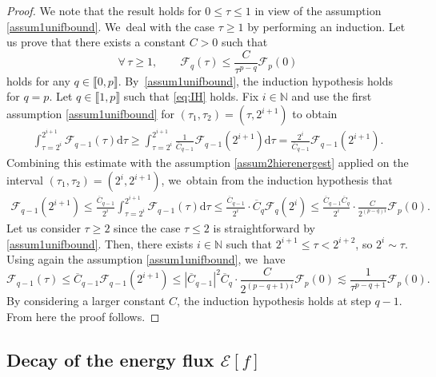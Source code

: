 \documentclass[JEP,XML,SOM,Unicode,published]{cedram}
\theoremstyle{plain}
\theoremstyle{definition}
\newcommand\dr{{\mathrm{d}}}
\begin{document}
\begin{proof}
We note that the result holds for $0 \leq \tau \leq 1$ in view of the assumption \ref{assum1unifbound}. We~deal with the case $\tau \geq 1$ by performing an induction. Let us prove that there exists a constant $C>0$ such that
\begin{equation}\label{eq:IH}
\forall \, \tau \geq 1, \qquad \mathcal{F}_q(\tau) \leq \frac{C}{\tau^{p-q}} \mathcal{F}_p(0) \tag{IH-q}
\end{equation}
holds for any $q \in \llbracket 0,p \rrbracket$. By~\ref{assum1unifbound}, the induction hypothesis holds for $q=p$. Let $q \in \llbracket 1,p \rrbracket$ such that \eqref{eq:IH} holds. Fix $i \in \mathbb{N}$ and use the first assumption \ref{assum1unifbound} for $(\tau_1,\tau_2)=(\tau,2^{i+1})$ to obtain
\begin{align*}
\int_{ \tau= 2^i}^{2^{i+1}} \mathcal{F}_{q-1}(\tau) \dr \tau \geq \int_{\tau = 2^i}^{2^{i+1}} \frac{1}{\overline{C}_{q-1}} \mathcal{F}_{q-1} (2^{i+1})\dr \tau =\frac{2^i}{\overline{C}_{q-1}} \mathcal{F}_{q-1} (2^{i+1}).
\end{align*}
Combining this estimate with the assumption \ref{assum2hierenergest} applied on the interval $(\tau_1,\tau_2)=(2^i,2^{i+1})$, we~obtain from the induction hypothesis that
\begin{align*}
\mathcal{F}_{q-1} (2^{i+1}) \leq \frac{\overline{C}_{q-1}}{2^i} \int_{ \tau=2^i}^{2^{i+1}} \mathcal{F}_{q-1}(\tau) \dr \tau \leq \frac{\overline{C}_{q-1}}{2^i} \cdot \overline{C}_q \mathcal{F}_q(2^i) \leq \frac{\overline{C}_{q-1}\overline{C}_q}{2^i} \cdot \frac{C}{2^{(p-q)i}} \mathcal{F}_p(0).
\end{align*}
Let us consider $\tau \geq 2$ since the case $\tau \leq 2$ is straightforward by \ref{assum1unifbound}. Then, there exists $i \in \mathbb{N}$ such that $2^{i+1} \leq \tau < 2^{i+2}$, so $2^i \sim \tau$. Using again the assumption \ref{assum1unifbound}, we~have
\[
\mathcal{F}_{q-1} (\tau) \leq \overline{C}_{q-1}\mathcal{F}_{q-1} (2^{i+1}) \leq |\overline{C}_{q-1}|^2\overline{C}_q \cdot \frac{C}{2^{(p-q+1)i}} \mathcal{F}_p(0) \lesssim \frac{1}{\tau^{p-q+1}} \mathcal{F}_p(0).
\]
By considering a larger constant $C$, the induction hypothesis holds at step $q-1$. From here the proof follows.
\end{proof}

\subsection{Decay of the energy flux $\mathcal{E}[f]$}\label{subsect_decay_fluxes}
\end{document}
